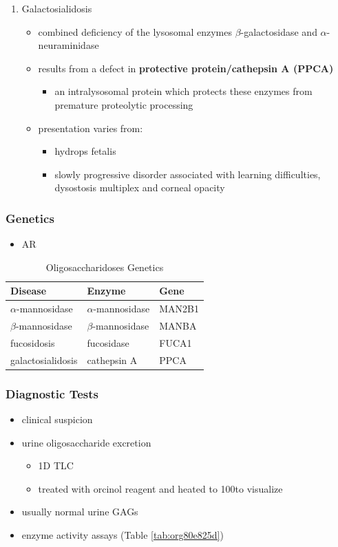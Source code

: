 \documentclass[12pt]{scrartcl}
\begin{document}
\begin{enumerate}
\item Galactosialidosis
\label{sec:org94b8d48}
\begin{itemize}
\item combined deficiency of the lysosomal enzymes \(\beta\)-galactosidase and
\(\alpha\)-neuraminidase
\item results from a defect in \textbf{protective protein/cathepsin A (PPCA)}
\begin{itemize}
\item an intralysosomal protein which protects these enzymes from
premature proteolytic processing
\end{itemize}
\item presentation varies from:
\begin{itemize}
\item hydrops fetalis
\item slowly progressive disorder associated with learning
difficulties, dysostosis multiplex and corneal opacity
\end{itemize}
\end{itemize}
\end{enumerate}

\subsubsection{Genetics}
\label{sec:orgc21c772}
\begin{itemize}
\item AR
\end{itemize}

\begin{table}[htbp]
\caption{\label{tab:org7b9e447}Oligosaccharidoses Genetics}
\centering
\begin{tabular}{lll}
Disease & Enzyme & Gene\\
\hline
\(\alpha\)-mannosidase & \(\alpha\)-mannosidase & MAN2B1\\
\(\beta\)-mannosidase & \(\beta\)-mannosidase & MANBA\\
fucosidosis & fucosidase & FUCA1\\
galactosialidosis & cathepsin A & PPCA\\
\end{tabular}
\end{table}

\subsubsection{Diagnostic Tests}
\label{sec:org1053c12}
\begin{itemize}
\item clinical suspicion
\item urine oligosaccharide excretion
\begin{itemize}
\item 1D TLC
\item treated with orcinol reagent and heated to 100\degreeC to visualize
\end{itemize}
\item usually normal urine GAGs
\item enzyme activity assays (Table \ref{tab:org80e825d})
\end{itemize}
\end{document}

